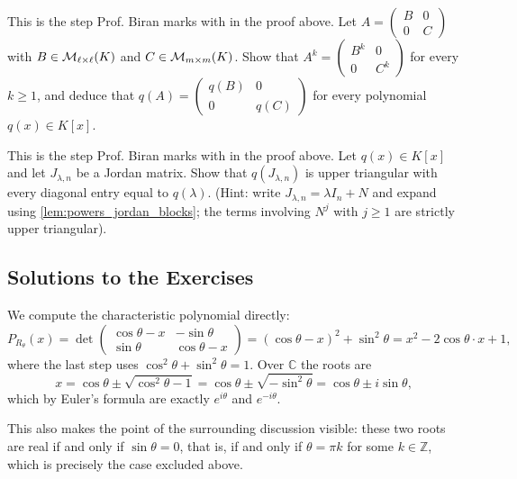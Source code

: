 \begin{exercise}
\label{exc:powers_of_block_diagonal}
This is the step Prof. Biran marks with  in the proof above. Let $A = \left(\begin{smallmatrix} B & 0 \\ 0 & C \end{smallmatrix}\right)$ with $B \in \mathcal{M}_{\ell \times \ell}(K)$ and $C \in \mathcal{M}_{m \times m}(K)$. Show that $A^k = \left(\begin{smallmatrix} B^k & 0 \\ 0 & C^k \end{smallmatrix}\right)$ for every $k \ge 1$, and deduce that $q(A) = \left(\begin{smallmatrix} q(B) & 0 \\ 0 & q(C) \end{smallmatrix}\right)$ for every polynomial $q(x) \in K[x]$.
\end{exercise}

\begin{exercise}
\label{exc:polynomial_of_jordan_block}
This is the step Prof. Biran marks with  in the proof above. Let $q(x) \in K[x]$ and let $J_{\lambda, n}$ be a Jordan matrix. Show that $q(J_{\lambda, n})$ is upper triangular with every diagonal entry equal to $q(\lambda)$. (Hint: write $J_{\lambda,n} = \lambda I_n + N$ and expand using \cref{lem:powers_jordan_blocks}; the terms involving $N^j$ with $j \ge 1$ are strictly upper triangular).
\end{exercise}
\subsection{Solutions to the Exercises}
\label{sec:solutions_jordan_a}

\begin{exercisesolution}
\label{sol:rotation_complex_eigenvalues}
We compute the characteristic polynomial directly:
\[
    P_{R_\theta}(x) = \det \begin{pmatrix} \cos\theta - x & -\sin\theta \\ \sin\theta & \cos\theta - x \end{pmatrix} = (\cos\theta - x)^2 + \sin^2\theta = x^2 - 2\cos\theta \cdot x + 1,
\]
where the last step uses $\cos^2\theta + \sin^2\theta = 1$. Over $\mathbb{C}$ the roots are
\[
    x = \cos\theta \pm \sqrt{\cos^2\theta - 1} = \cos\theta \pm \sqrt{-\sin^2\theta} = \cos\theta \pm i \sin\theta,
\]
which by Euler's formula are exactly $e^{i\theta}$ and $e^{-i\theta}$.

This also makes the point of the surrounding discussion visible: these two roots are real if and only if $\sin\theta = 0$, that is, if and only if $\theta = \pi k$ for some $k \in \mathbb{Z}$, which is precisely the case excluded above.
\end{exercisesolution}

